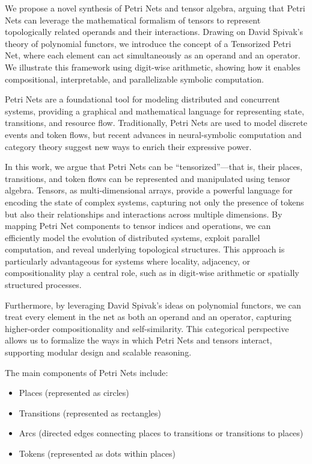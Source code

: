 

We propose a novel synthesis of Petri Nets and tensor algebra, arguing that Petri Nets can leverage the mathematical formalism of tensors to represent topologically related operands and their interactions. Drawing on David Spivak’s theory of polynomial functors, we introduce the concept of a Tensorized Petri Net, where each element can act simultaneously as an operand and an operator. We illustrate this framework using digit-wise arithmetic, showing how it enables compositional, interpretable, and parallelizable symbolic computation.

Petri Nets are a foundational tool for modeling distributed and concurrent systems, providing a graphical and mathematical language for representing state, transitions, and resource flow. Traditionally, Petri Nets are used to model discrete events and token flows, but recent advances in neural-symbolic computation and category theory suggest new ways to enrich their expressive power.

In this work, we argue that Petri Nets can be “tensorized”—that is, their places, transitions, and token flows can be represented and manipulated using tensor algebra. Tensors, as multi-dimensional arrays, provide a powerful language for encoding the state of complex systems, capturing not only the presence of tokens but also their relationships and interactions across multiple dimensions. By mapping Petri Net components to tensor indices and operations, we can efficiently model the evolution of distributed systems, exploit parallel computation, and reveal underlying topological structures. This approach is particularly advantageous for systems where locality, adjacency, or compositionality play a central role, such as in digit-wise arithmetic or spatially structured processes.

Furthermore, by leveraging David Spivak’s ideas on polynomial functors, we can treat every element in the net as both an operand and an operator, capturing higher-order compositionality and self-similarity. This categorical perspective allows us to formalize the ways in which Petri Nets and tensors interact, supporting modular design and scalable reasoning.

The main components of Petri Nets include:
\begin{itemize}
    \item Places (represented as circles)
    \item Transitions (represented as rectangles)
    \item Arcs (directed edges connecting places to transitions or transitions to places)
    \item Tokens (represented as dots within places)
\end{itemize}

